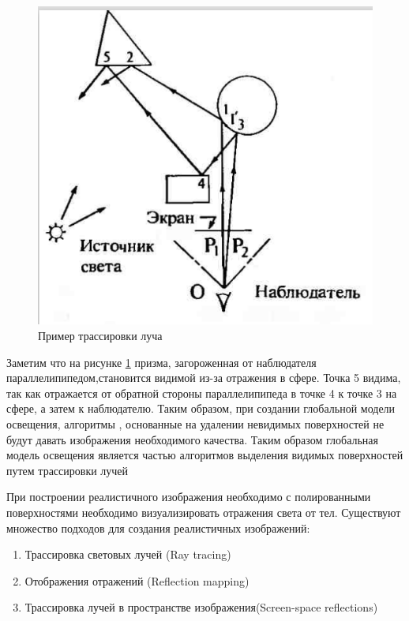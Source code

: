 \documentclass[a4paper,14pt, unknownkeysallowed]{extreport}
\begin{document}
\begin{figure}[H]
	\centering
	\includegraphics{global_model_light.png}
	\caption{Пример трассировки луча}
	\label{fig:global_model_light}
\end{figure} 

Заметим что на рисунке \ref{fig:global_model_light}  призма, загороженная от наблюдателя параллелипипедом,становится видимой из-за отражения в сфере.
Точка 5 видима, так как отражается от обратной стороны параллелипипеда в точке 4 к точке 3 на сфере, а затем к наблюдателю.
Таким образом, при создании глобальной модели освещения, алгоритмы , основанные на удалении невидимых поверхностей не будут давать изображения необходимого качества.
Таким образом глобальная модель освещения является частью алгоритмов выделения видимых поверхностей путем трассировки лучей\cite{Rodgers}


При построении реалистичного изображения необходимо с полированными поверхностями необходимо визуализировать отражения света от тел.
Существуют множество подходов для создания реалистичных изображений:
\begin{enumerate}
	\item Трассировка световых лучей (Ray tracing)
	\item Отображения отражений (Reflection mapping)
	\item Трассировка лучей в пространстве изображения(Screen-space reflections)
\end{enumerate}
\end{document}
